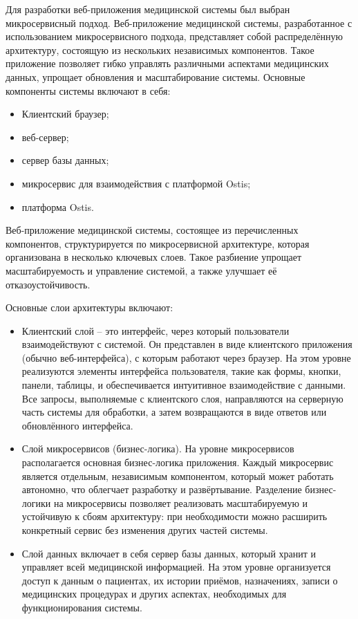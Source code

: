 Для разработки веб-приложения медицинской системы был выбран микросервисный подход. Веб-приложение медицинской системы, разработанное с использованием микросервисного подхода, представляет собой распределённую архитектуру, состоящую из нескольких независимых компонентов. Такое приложение позволяет гибко управлять различными аспектами медицинских данных, упрощает обновления и масштабирование системы. Основные компоненты системы включают в себя:
\begin{itemize}
    \item Клиентский браузер;
    \item веб-сервер;
    \item сервер базы данных;
    \item микросервис для взаимодействия с платформой Ostis;
    \item платформа Ostis.
\end{itemize}
Веб-приложение медицинской системы, состоящее из перечисленных компонентов, структурируется по микросервисной архитектуре, которая организована в несколько ключевых слоев. Такое разбиение упрощает масштабируемость и управление системой, а также улучшает её отказоустойчивость.

Основные слои архитектуры включают:
\begin{itemize}
    \item Клиентский слой – это интерфейс, через который пользователи взаимодействуют с системой. Он представлен в виде клиентского приложения (обычно веб-интерфейса), с которым работают через браузер. На этом уровне реализуются элементы интерфейса пользователя, такие как формы, кнопки, панели, таблицы, и обеспечивается интуитивное взаимодействие с данными. Все запросы, выполняемые с клиентского слоя, направляются на серверную часть системы для обработки, а затем возвращаются в виде ответов или обновлённого интерфейса.
    \item Слой микросервисов (бизнес-логика). На уровне микросервисов располагается основная бизнес-логика приложения. Каждый микросервис является отдельным, независимым компонентом, который может работать автономно, что облегчает разработку и развёртывание. Разделение бизнес-логики на микросервисы позволяет реализовать масштабируемую и устойчивую к сбоям архитектуру: при необходимости можно расширить конкретный сервис без изменения других частей системы.
    \item Слой данных включает в себя сервер базы данных, который хранит и управляет всей медицинской информацией. На этом уровне организуется доступ к данным о пациентах, их истории приёмов, назначениях, записи о медицинских процедурах и других аспектах, необходимых для функционирования системы.
\end{itemize}

